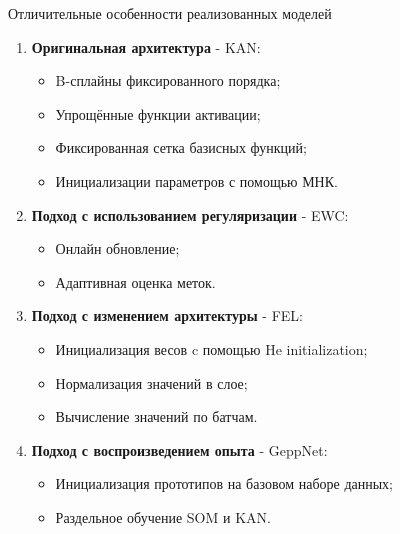 \documentclass{beamer}
\begin{document}
\begin{frame}{Отличительные особенности реализованных моделей}
  \begin{enumerate}
    \item \textbf{Оригинальная архитектура} - KAN:
      \begin{itemize}
        \item B-сплайны фиксированного порядка;
        \item Упрощённые функции активации;
        \item Фиксированная сетка базисных функций;
        \item Инициализации параметров с помощью МНК.
      \end{itemize}
    \item \textbf{Подход с использованием регуляризации} - EWC:
      \begin{itemize}
        \item Онлайн обновление;
        \item Адаптивная оценка меток.
      \end{itemize}
    \item \textbf{Подход с изменением архитектуры} - FEL:
      \begin{itemize}
        \item Инициализация весов c помощью He initialization;
        \item Нормализация значений в слое;
        \item Вычисление значений по батчам.
      \end{itemize}
    \item \textbf{Подход с воспроизведением опыта} - GeppNet:
      \begin{itemize}
        \item Инициализация прототипов на базовом наборе данных;
        \item Раздельное обучение SOM и KAN.
      \end{itemize}
  \end{enumerate}
\end{frame}
\end{document}
